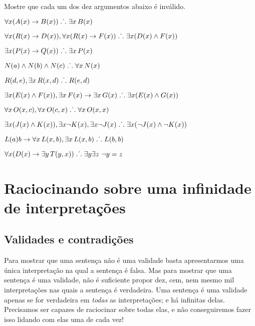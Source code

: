 \problempart
Mostre que cada um dos dez argumentos abaixo é inválido.
\begin{earg}
\item $\forall x(\mathord{A}(x) \rightarrow \mathord{B}(x)) \mathrel{\ldotp\dot{}\,\ldotp} \exists x\, \mathord{B}(x)$
\item $\forall x(\mathord{R}(x) \rightarrow \mathord{D}(x)), \forall x(\mathord{R}(x) \rightarrow \mathord{F}(x)) \mathrel{\ldotp\dot{}\,\ldotp} \exists x(\mathord{D}(x) \wedge \mathord{F}(x))$
\item $\exists x(\mathord{P}(x)\rightarrow \mathord{Q}(x)) \mathrel{\ldotp\dot{}\,\ldotp} \exists x\, \mathord{P}(x)$
\item $\mathord{N}(a) \wedge \mathord{N}(b) \wedge \mathord{N}(c) \mathrel{\ldotp\dot{}\,\ldotp} \forall x\, \mathord{N}(x)$
\item $\mathord{R}(d,e), \exists x\, \mathord{R}(x,d) \mathrel{\ldotp\dot{}\,\ldotp} \mathord{R}(e,d)$
\item $\exists x(\mathord{E}(x) \wedge \mathord{F}(x)), \exists x\, \mathord{F}(x) \rightarrow \exists x\, \mathord{G}(x) \mathrel{\ldotp\dot{}\,\ldotp} \exists x(\mathord{E}(x) \wedge \mathord{G}(x))$
\item $\forall x\, \mathord{O}(x,c), \forall x\, \mathord{O}(c,x) \mathrel{\ldotp\dot{}\,\ldotp} \forall x\, \mathord{O}(x,x)$
\item $\exists x(\mathord{J}(x) \wedge \mathord{K}(x)), \exists x \neg \mathord{K}(x), \exists x \neg \mathord{J}(x) \mathrel{\ldotp\dot{}\,\ldotp} \exists x(\neg \mathord{J}(x) \wedge \neg \mathord{K}(x))$
\item $\mathord{L}(a)b \rightarrow \forall x\, \mathord{L}(x,b), \exists x\, \mathord{L}(x,b) \mathrel{\ldotp\dot{}\,\ldotp} \mathord{L}(b,b)$
\item $\forall x(\mathord{D}(x) \rightarrow \exists y\, \mathord{T}(y,x)) \mathrel{\ldotp\dot{}\,\ldotp} \exists y \exists z\ \neg y= z$
\end{earg}


\chapter[Infinitas interpretações]{Raciocinando sobre uma infinidade de interpretações}\label{s:InfinitInterpret}

\section{Validades e contradições}
Para mostrar que uma sentença não é uma validade basta apresentarmos uma única interpretação na qual a sentença é falsa.
Mas para mostrar que uma sentença é uma validade, não é suficiente propor dez, cem, nem mesmo mil interpretações nas quais a sentença é verdadeira.
Uma sentença é uma validade apenas se for verdadeira em \emph{todas} as interpretações; e há infinitas delas.
Precisamos ser capazes de raciocinar sobre todas elas, e não conseguiremos fazer isso lidando com elas uma de cada vez!

